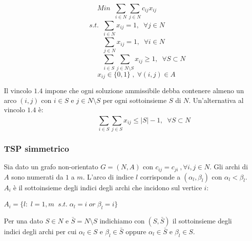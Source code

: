 \begin{equation}
	Min\;\;\displaystyle\sum_{i\in N}^{} \sum_{j\in N}^{} c_{ij} x_{ij}
\end{equation}
\begin{equation}
	s.t.\;\;\displaystyle\sum_{i\in N}^{} x_{ij} = 1,\;\;\forall j \in N
\end{equation}
\begin{equation}
	\;\;\;\;\;\;\;\displaystyle\sum_{j\in N}^{} x_{ij} = 1,\;\;\forall i \in N
\end{equation}
\begin{equation}
	\;\;\;\;\;\;\;\;\;\;\;\;\;\;\;\;\;\;\displaystyle\sum_{i\in S}^{} \sum_{j\in N\setminus S}^{} x_{ij} \ge 1,\;\;\forall S \subset N
\end{equation}
\begin{equation}
	\;\;\;\;\;\;\;\;\;\;x_{ij} \in \{0,1\}\;,\;\forall (i,j) \in A
\end{equation}

Il vincolo $1.4$ impone che ogni soluzione ammissibile debba contenere almeno un arco $(i,j)$ con $i\in S$ e $j\in N\setminus S$ per ogni sottoinsieme $S$ di $N$.
Un'alternativa al vincolo $1.4$ è:
\begin{equation}\tag{1.4'}
\;\;\;\;\;\;\;\;\;\;\;\;\;\;\;\;\;\;\displaystyle\sum_{i\in S}^{} \sum_{j\in S}^{} x_{ij} \le |S| - 1,\;\;\forall S \subset N
\end{equation}

\subsubsection{TSP simmetrico}
Sia dato un grafo non-orientato $G=(N,A)$ con $c_{ij} = c_{ji}\:,\forall i,j\in N$.\newline
Gli archi di $A$ sono numerati da $1$ a $m$. L'arco di indice $l$ corrisponde a $(\alpha_{l},\beta_{l})$ con $\alpha_{l} < \beta_{l}$.\newline
$A_{i}$ è il sottoinsieme degli indici degli archi che incidono sul vertice $i$:
\begin{center}
	$A_{i} = \{l:\;l=1,m\;\;s.t.\;\alpha_{l}=i\;or\;\beta_{l}=i\}$
\end{center}

Per una dato $S\in N$ e $\bar{S} = N\setminus S$ indichiamo con $(S, \bar{S})$ il sottoinsieme degli indici degli archi per cui $\alpha_{l}\in S$ e $\beta_{l}\in \bar{S}$ oppure $\alpha_{l}\in \bar{S}$ e $\beta_{l}\in S$.

